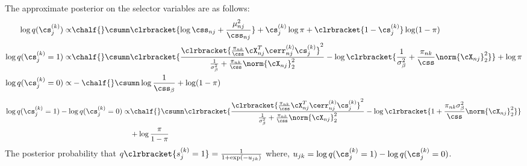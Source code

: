 \documentclass{article}
\begin{document}
The approximate posterior on the selector variables are as follows:
\begin{align}
\nonumber \log q(\cs_j^{(k)})\propto &\chalf{}\csumn\clrbracket{\log\css_{nj}+\frac{\mu_{nj}^2}{\css_{nj}}}+\cs_j^{(k)}\log\pi+\clrbracket{1-\cs_j^{(k)}}\log(1-\pi)\\
\nonumber \log q(\cs_j^{(k)}=1)\propto & \chalf{}\csumn \clrbracket{\frac{\clrbracket{\frac{\pi_{nk}}{\css}\cX_{nj}^T\cerr_{nj}^{(k)}\cs_j^{(k)}}^2}{\frac{1}{\sigma_\beta^2}+\frac{\pi_{nk}}{\css}\norm{\cX_{nj}}_2^2}-\log\clrbracket{\frac{1}{\sigma_\beta^2}+\frac{\pi_{nk}}{\css}\norm{\cX_{nj}}_2^2}}+\log\pi\\
\nonumber \log q(\cs_j^{(k)}=0)\propto & -\chalf{}\csumn\log\frac{1}{\css_\beta}+\log(1-\pi)
\end{align}
\begin{align}
\nonumber \log q(\cs_j^{(k)}=1)-\log q(\cs_j^{(k)}=0)\propto & \chalf{}\csumn \clrbracket{\frac{\clrbracket{\frac{\pi_{nk}}{\css}\cX_{nj}^T\cerr_{nj}^{(k)}\cs_j^{(k)}}^2}{\frac{1}{\sigma_\beta^2}+\frac{\pi_{nk}}{\css}\norm{\cX_{nj}}_2^2}-\log\clrbracket{1+\frac{\pi_{nk}\sigma_\beta^2}{\css}\norm{\cX_{nj}}_2^2}}\\
\nonumber &+\log\frac{\pi}{1-\pi}
\end{align}
The posterior probability that $q\clrbracket{s_j^{(k)}=1}=\frac{1}{1+\exp(-u_{jk})}$ where, $u_{jk}= \log q(\cs_j^{(k)}=1)-\log q(\cs_j^{(k)}=0)$.
\end{document}
